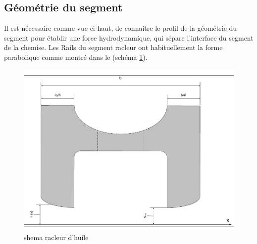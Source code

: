 \subsection{Géométrie du segment}
Il est nécessaire comme vue ci-haut, de connaitre le profil de la géométrie du segment pour établir une force hydrodynamique, qui sépare l'interface du segment de la chemise. Les Rails du segment racleur ont habituellement la forme parabolique comme montré dans le (schéma \ref{fig:profil-du-segment-racleur}).
\begin{figure}[h!]
	\centering
	\includegraphics[width=0.7\linewidth]{"Img/profil du segment racleur"}
	\caption[shema racleur d'huile]{shema racleur d'huile}
	\label{fig:profil-du-segment-racleur}
\end{figure}

